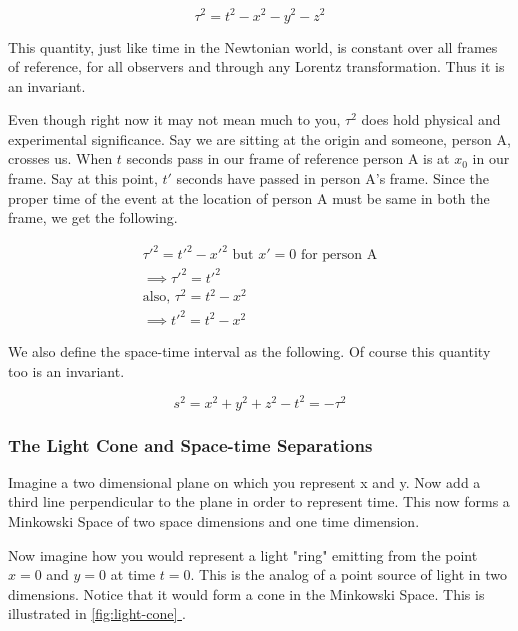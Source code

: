 \documentclass[16pt]{scrartcl}
\newcommand*{\fullref}[1]{\hyperref[{#1}]{\autoref*{#1} \nameref*{#1}}}
\numberwithin{equation}{section}
\theoremstyle{plain}
\theoremstyle{definition}
\begin{document}
\begin{equation}
    \tau^2 = t^2 - x^2 - y^2 - z^2
    \label{eq:propertime}
\end{equation}

This quantity, just like time in the Newtonian world, is constant over all frames of reference, for all observers and through any Lorentz transformation. Thus it is an invariant. 

Even though right now it may not mean much to you, $\tau^2$ does hold physical and experimental significance. Say we are sitting at the origin and someone, person A, crosses us. When $t$ seconds pass in our frame of reference person A is at $x_0$ in our frame. Say at this point, $t'$ seconds have passed in person A's frame. Since the proper time of the event at the location of person A must be same in both the frame, we get the following.

\begin{gather}
    \tau'^2 = t'^2 - x'^2 \text{ but } x'=0 \text{ for person A} \\
    \implies \tau'^2 = t'^2\\
    \text{also, } \tau^2 = t^2 - x^2\\
    \implies t'^2 = t^2 - x^2
    \label{eq:proper-time-significance}
\end{gather}

We also define the space-time interval as the following. Of course this quantity too is an invariant.

\begin{equation}
    s^2 = x^2 + y^2 + z^2 - t^2 = - \tau^2
    \label{eq:spacetime-interval}
\end{equation}



\subsubsection*{The Light Cone and Space-time Separations}

Imagine a two dimensional plane on which you represent x and y. Now add a third line perpendicular to the plane in order to represent time. This now forms a Minkowski Space of two space dimensions and one time dimension. 

Now imagine how you would represent a light "ring" emitting from the point $x = 0$ and $y = 0$ at time $t = 0$. This is the analog of a point source of light in two dimensions. Notice that it would form a cone in the Minkowski Space. This is illustrated in \fullref{fig:light-cone}.
\end{document}

